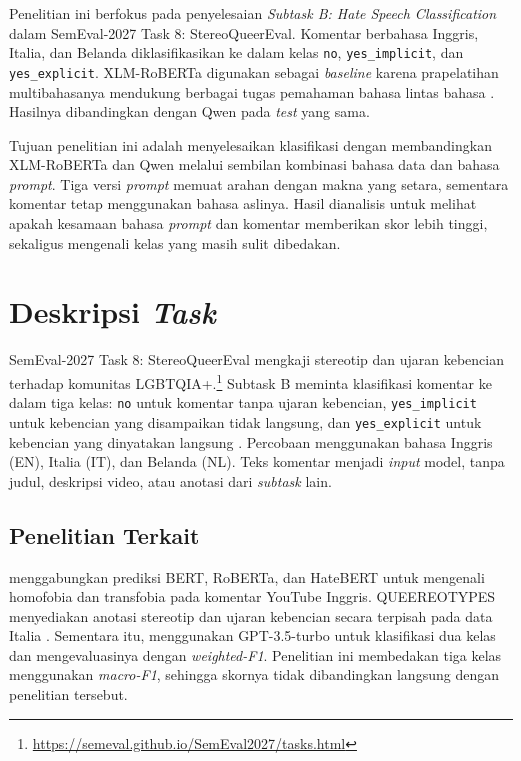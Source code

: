 \documentclass[11pt]{article}
\begin{document}
Penelitian ini berfokus pada penyelesaian \textit{Subtask B: Hate Speech Classification} dalam SemEval-2027 Task 8: StereoQueerEval. Komentar berbahasa Inggris, Italia, dan Belanda diklasifikasikan ke dalam kelas \texttt{no}, \texttt{yes\_implicit}, dan \texttt{yes\_explicit}. XLM-RoBERTa digunakan sebagai \textit{baseline} karena prapelatihan multibahasanya mendukung berbagai tugas pemahaman bahasa lintas bahasa \citep{conneau-etal-2020-unsupervised}. Hasilnya dibandingkan dengan Qwen pada \textit{test} yang sama.

Tujuan penelitian ini adalah menyelesaikan klasifikasi dengan membandingkan XLM-RoBERTa dan Qwen melalui sembilan kombinasi bahasa data dan bahasa \textit{prompt}. Tiga versi \textit{prompt} memuat arahan dengan makna yang setara, sementara komentar tetap menggunakan bahasa aslinya. Hasil dianalisis untuk melihat apakah kesamaan bahasa \textit{prompt} dan komentar memberikan skor lebih tinggi, sekaligus mengenali kelas yang masih sulit dibedakan.

\section{Deskripsi \textit{Task}}
SemEval-2027 Task 8: StereoQueerEval mengkaji stereotip dan ujaran kebencian terhadap komunitas LGBTQIA+.\footnote{\url{https://semeval.github.io/SemEval2027/tasks.html}} Subtask B meminta klasifikasi komentar ke dalam tiga kelas: \texttt{no} untuk komentar tanpa ujaran kebencian, \nolinkurl{yes_implicit} untuk kebencian yang disampaikan tidak langsung, dan \nolinkurl{yes_explicit} untuk kebencian yang dinyatakan langsung \citep{stereoqueereval-2026-data}. Percobaan menggunakan bahasa Inggris (EN), Italia (IT), dan Belanda (NL). Teks komentar menjadi \textit{input} model, tanpa judul, deskripsi video, atau anotasi dari \textit{subtask} lain.

\subsection{Penelitian Terkait}
\citet{nozza-2022-nozza} menggabungkan prediksi BERT, RoBERTa, dan HateBERT untuk mengenali homofobia dan transfobia pada komentar YouTube Inggris. QUEEREOTYPES menyediakan anotasi stereotip dan ujaran kebencian secara terpisah pada data Italia \citep{cignarella-etal-2024-queereotypes}. Sementara itu, \citet{chan-etal-2024-hate} menggunakan GPT-3.5-turbo untuk klasifikasi dua kelas dan mengevaluasinya dengan \textit{weighted-F1}. Penelitian ini membedakan tiga kelas menggunakan \textit{macro-F1}, sehingga skornya tidak dibandingkan langsung dengan penelitian tersebut.
\end{document}
